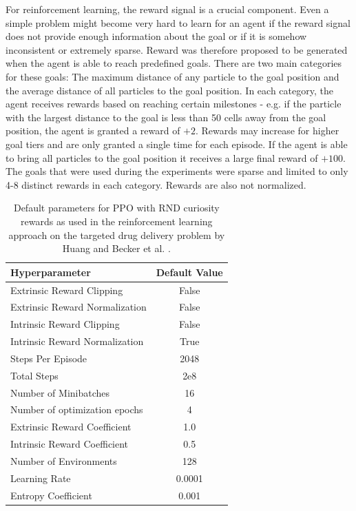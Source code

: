 For reinforcement learning, the reward signal is a crucial component. Even a simple problem might become very hard to learn for an agent if the reward signal does not provide enough information about the goal or if it is somehow inconsistent or extremely sparse. Reward was therefore proposed to be generated when the agent is able to reach predefined goals. There are two main categories for these goals: The maximum distance of any particle to the goal position and the average distance of all particles to the goal position. In each category, the agent receives rewards based on reaching certain milestones - e.g. if the particle with the largest distance to the goal is less than 50 cells away from the goal position, the agent is granted a reward of $+2$. Rewards may increase for higher goal tiers and are only granted a single time for each episode. If the agent is able to bring all particles to the goal position it receives a large final reward of $+100$. The goals that were used during the experiments were sparse and limited to only 4-8 distinct rewards in each category. Rewards are also not normalized.

\begin{table} [ht]
    \begin{center}
        \begin{tabular}{|p{6.5cm}|c|}
            \hline
            Hyperparameter & Default Value \\
            \hline
            Extrinsic Reward Clipping & False \\
            Extrinsic Reward Normalization & False \\
            Intrinsic Reward Clipping & False \\
            Intrinsic Reward Normalization & True \\
            Steps Per Episode & 2048 \\
            Total Steps & 2e8 \\
            Number of Minibatches & 16 \\
            Number of optimization epochs & 4 \\
            Extrinsic Reward Coefficient & 1.0 \\
            Intrinsic Reward Coefficient & 0.5 \\
            Number of Environments & 128 \\
            Learning Rate & 0.0001 \\
            Entropy Coefficient & 0.001 \\
            \hline
        \end{tabular}
    \end{center}
    \caption[RL Approach Default Parameters]{Default parameters for PPO with RND curiosity rewards as used in the reinforcement learning approach on the targeted drug delivery problem by Huang and Becker et al. \cite{huang2019}.} \label{tab:RLDefaults}
\end{table}

